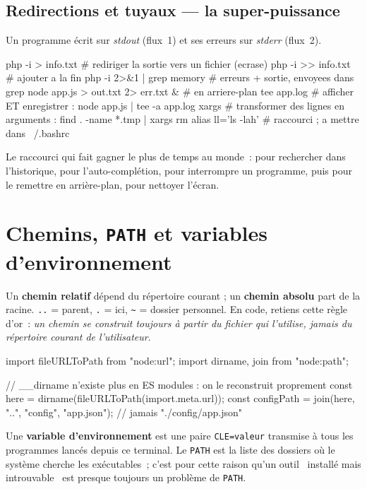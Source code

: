 \subsection{Redirections et tuyaux --- la super-puissance}

Un programme \'ecrit sur \emph{stdout} (flux~1) et ses erreurs sur \emph{stderr} (flux~2).
\begin{terminal}
php -i > info.txt              # rediriger la sortie vers un fichier (ecrase)
php -i >> info.txt             # ajouter a la fin
php -i 2>&1 | grep memory       # erreurs + sortie, envoyees dans grep
node app.js > out.txt 2> err.txt &   # en arriere-plan
tee app.log                   # afficher ET enregistrer : node app.js | tee -a app.log
xargs                         # transformer des lignes en arguments : find . -name *.tmp | xargs rm
alias ll='ls -lah'            # raccourci ; a mettre dans ~/.bashrc
\end{terminal}

\begin{astuce}
Le raccourci qui fait gagner le plus de temps au monde~:  pour rechercher dans
l'historique,  pour l'auto-compl\'etion,  pour interrompre un programme,
 puis  pour le remettre en arri\`ere-plan,  pour nettoyer l'\'ecran.
\end{astuce}

\section{Chemins, \texttt{PATH} et variables d'environnement}

Un \textbf{chemin relatif} d\'epend du r\'epertoire courant ; un \textbf{chemin absolu} part de la
racine. \verb|..| = parent, \verb|.| = ici, \verb|~| = dossier personnel. En code, retiens cette
r\`egle d'or~: \emph{un chemin se construit toujours \`a partir du fichier qui l'utilise, jamais du
r\'epertoire courant de l'utilisateur}.

\begin{codejs}
import { fileURLToPath } from "node:url";
import { dirname, join } from "node:path";

// __dirname n'existe plus en ES modules : on le reconstruit proprement
const here = dirname(fileURLToPath(import.meta.url));
const configPath = join(here, "..", "config", "app.json");  // jamais "./config/app.json"
\end{codejs}

Une \textbf{variable d'environnement} est une paire \verb|CLE=valeur| transmise \`a tous les
programmes lanc\'es depuis ce terminal. Le \verb|PATH| est la liste des dossiers o\`u le syst\`eme
cherche les ex\'ecutables~; c'est pour cette raison qu'un outil \og ~install\'e mais introuvable~ \fg{} est
presque toujours un probl\`eme de \verb|PATH|.

